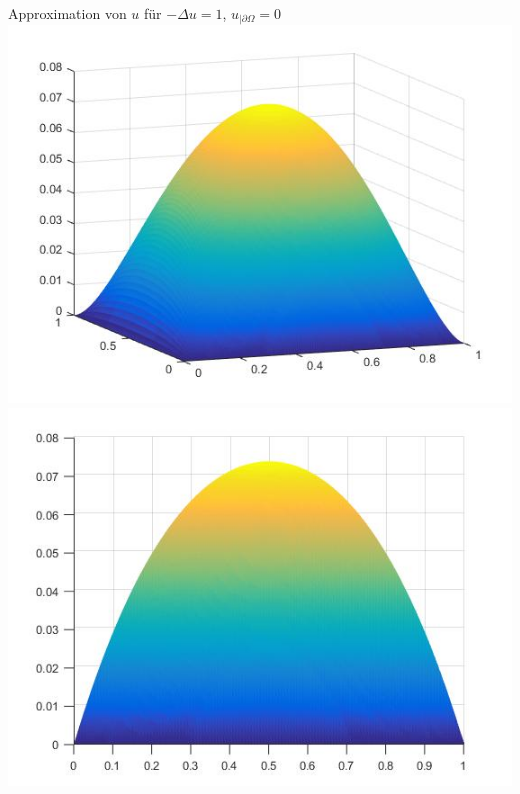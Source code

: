 \documentclass[xcolor=svgnames,ngerman]{beamer}
\begin{document}
	\begin{frame}{Approximation von $u$ für $-\Delta u =1$, $u_{|\partial \Omega}=0  $ }
	\includegraphics[scale=0.3]{solution1.jpg}
	\includegraphics[scale=0.3]{solution2.jpg}
	\end{frame}	
	
\end{document}
